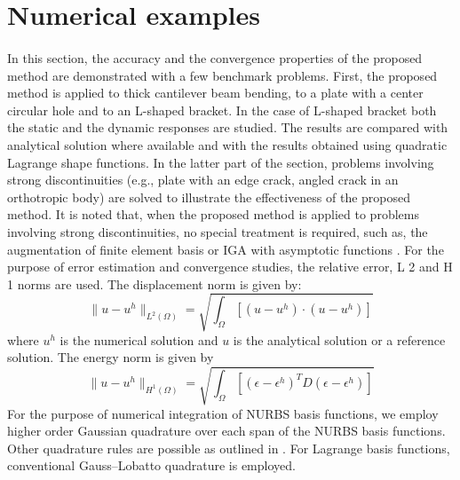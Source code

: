 \section{Numerical examples}
\label{iso_section:examples}
\paragraph{}
In this section, the accuracy and the convergence properties of the proposed method are demonstrated with a few
    benchmark problems.
First, the proposed method is applied to thick cantilever beam bending, to a plate with a center
    circular hole and to an L-shaped bracket.
In the case of L-shaped bracket both the static and the dynamic responses are studied.
The results are compared with analytical solution where available and with the results obtained using quadratic
    Lagrange shape functions.
In the latter part of the section, problems involving strong discontinuities (e.g., plate with an edge crack,
    angled crack in an orthotropic body) are solved to illustrate the effectiveness of the proposed method.
It is noted that, when the proposed method is applied to problems involving strong discontinuities, no special 
    treatment is required, such as, the augmentation of finite element basis or IGA with asymptotic functions
    \cite{Benson2010} \cite{De2011}.
For the purpose of error estimation and convergence studies, the relative error, L 2 and H 1 norms are used.
The displacement norm is given by:
    \begin{equation}
        \| u - u^h \|_{L^2(\Omega)}=
        \sqrt{
            \int_{\Omega}\left[
                \left(
                    u-u^h
                \right) \cdot
                \left(
                    u-u^h
                \right)
            \right]
        }
    \end{equation}
%
where $u^h$ is the numerical solution and $u$ is the analytical solution or a reference solution.
The energy norm is given by
    \begin{equation}
        \| u - u^h \|_{H^1(\Omega)}=
        \sqrt{
            \int_{\Omega}\left[
                \left(
                    \epsilon - \epsilon^h
                \right)^T D
                \left(
                    \epsilon - \epsilon^h
                \right)
            \right]
        }
    \end{equation}
%
For the purpose of numerical integration of NURBS basis functions, we employ higher order Gaussian quadrature over each span of the NURBS basis functions.
Other quadrature rules are possible as outlined in \cite{Hug2010}.
For Lagrange basis functions, conventional Gauss–Lobatto quadrature is employed.

